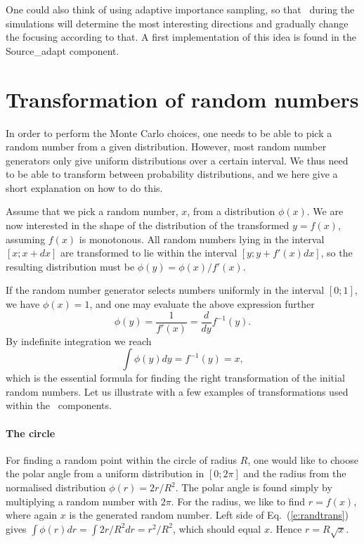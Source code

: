 One could also think of using adaptive importance sampling, %
so that \MCS\ during the simulations will determine
the most interesting directions and gradually change
the focusing according to that. A first implementation of this idea is
found in the Source\_adapt component.%

\section{Transformation of random numbers}
In order to perform the Monte Carlo choices, one needs to be able to
pick a random number from a given distribution. However, most
random number generators only give
uniform distributions over a certain interval.
We thus need to be able to transform between probability distributions,
and we here give a short explanation on how to do this.

Assume that we pick a random number, $x$, from a distribution $\phi(x)$.
We are now interested in the shape of the distribution of the
transformed $y=f(x)$, assuming $f(x)$ is monotonous.
All random numbers lying in the interval $[x; x+dx]$
are transformed to lie within the interval $[y; y+f'(x)dx]$, so the
resulting distribution must be $\phi(y) = \phi(x) / f'(x)$.

If the random number generator selects numbers uniformly in the interval
$[0; 1]$, we have $\phi(x) = 1$, and
one may evaluate the above expression further
\begin{equation}
\phi(y) = \frac{1}{f'(x)} = \frac{d}{dy} f^{-1}(y) .
\end{equation}
By indefinite integration we reach
\begin{equation}
\label{e:randtrans}
\int \phi(y) dy = f^{-1}(y) = x ,
\end{equation}
which is the essential formula for finding the right transformation
of the initial random numbers.
Let us illustrate with a few examples of transformations used within the
\MCS\ components.

\paragraph{The circle}
For finding a random point within the
circle of radius $R$, one would like to choose the polar angle from a uniform
distribution in $[0; 2\pi]$ and the radius from the normalised distribution
$\phi(r)=2r/R^2$.
The polar angle is found simply by multiplying a random number
with $2\pi$. For the radius, we like to find $r=f(x)$, where again $x$
is the generated random number. Left side of Eq.~(\ref{e:randtrans}) gives
$\int \phi(r) dr = \int 2 r/R^2 dr = r^2/R^2$, which should equal $x$.
Hence $r = R\sqrt{x}$.


